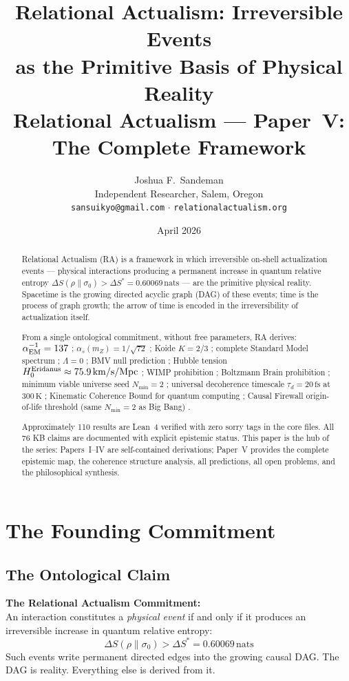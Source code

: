 \documentclass[12pt,a4paper]{article}
\title{\textbf{Relational Actualism: Irreversible Events\\
as the Primitive Basis of Physical Reality}\\[0.5em]
\large\normalfont Relational Actualism --- Paper~V: The Complete Framework}
\author{Joshua F.~Sandeman\\\small Independent Researcher, Salem, Oregon\\\small \texttt{sansuikyo@gmail.com} $\cdot$ \texttt{relationalactualism.org}}
\date{April 2026}
\begin{document}
\maketitle

\begin{abstract}
Relational Actualism (RA) is a framework in which irreversible on-shell actualization events --- physical interactions producing a permanent increase in quantum relative entropy $\Delta S(\rho\|\sigma_0)>\Delta S^*=0.60069\,\mathrm{nats}$ --- are the primitive physical reality.  Spacetime is the growing directed acyclic graph (DAG) of these events; time is the process of graph growth; the arrow of time is encoded in the irreversibility of actualization itself.

From a single ontological commitment, without free parameters, RA derives: $\alpha_{\rm EM}^{-1}=137$ \statusLV; $\alpha_s(m_Z)=1/\sqrt{72}$ \statusCV; Koide $K=2/3$ \statusLV; complete Standard Model spectrum \statusLV; $\Lambda=0$ \statusDR; BMV null prediction \statusDR; Hubble tension $H_0^{\rm Eridanus}\approx75.9\,\mathrm{km/s/Mpc}$ \statusCV; WIMP prohibition \statusDR; Boltzmann Brain prohibition \statusDR; minimum viable universe seed $N_{\min}=2$ \statusDR; universal decoherence timescale $\tau_d=20\,\mathrm{fs}$ at $300\,\mathrm{K}$ \statusDR; Kinematic Coherence Bound for quantum computing \statusAR; Causal Firewall origin-of-life threshold (same $N_{\min}=2$ as Big Bang) \statusDR.

Approximately 110 results are Lean~4 verified with zero sorry tags in the core files.  All 76 KB claims are documented with explicit epistemic status.  This paper is the hub of the series: Papers~I--IV are self-contained derivations; Paper~V provides the complete epistemic map, the coherence structure analysis, all predictions, all open problems, and the philosophical synthesis.
\end{abstract}

\tableofcontents\bigskip

\section{The Founding Commitment}\label{sec:commitment}

\subsection{The Ontological Claim}

\begin{mdframed}[linecolor=cv_blue!60,backgroundcolor=cv_blue!5,linewidth=2pt]
\textbf{The Relational Actualism Commitment:}\\[0.3em]
An interaction constitutes a \emph{physical event} if and only if it produces an irreversible increase in quantum relative entropy:
\begin{equation}
  \Delta S(\rho\|\sigma_0) > \Delta S^* = 0.60069\,\mathrm{nats}
\end{equation}
Such events write permanent directed edges into the growing causal DAG.  The DAG is reality.  Everything else is derived from it.
\end{mdframed}
\end{document}
